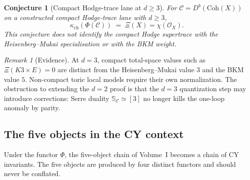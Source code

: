 \documentclass[11pt]{article}
\theoremstyle{plain}
\newtheorem{conjecture}[theorem]{Conjecture}
\theoremstyle{definition}
\theoremstyle{remark}
\newtheorem{remark}[theorem]{Remark}
\newcommand{\cC}{\mathcal{C}}
\newcommand{\cO}{\mathcal{O}}
\newcommand{\bS}{\mathbb{S}}
\newcommand{\Coh}{\mathrm{Coh}}
\begin{document}
\begin{conjecture}[Compact Hodge-trace lane at $d \geq 3$]
\label{conj:v3-st-cy-kappa-d3}
For $\cC=D^b(\Coh(X))$ on a constructed compact Hodge-trace lane with
$d \geq 3$,
\[
 \kappa_{\mathrm{ch}}(\Phi(\cC)) \;=\; \Xi(X)=\chi(\cO_X).
\]
This conjecture does not identify the compact Hodge supertrace with
the Heisenberg--Mukai specialisation or with the BKM weight.
\end{conjecture}

\begin{remark}[Evidence]
\label{rem:v3-st-d3-evidence}
At $d = 3$, compact total-space values such as
$\Xi(K3\times E)=0$ are distinct from the Heisenberg--Mukai value
$3$ and the BKM value $5$.  Non-compact toric local models require
their own normalization.  The obstruction to extending the $d = 2$
proof is that the $d = 3$ quantization step may introduce corrections:
Serre duality $\bS_\cC \simeq [3]$ no longer kills the one-loop
anomaly by parity.
\end{remark}

\subsection{The five objects in the CY context}

Under the functor $\Phi$, the five-object chain of Volume~I
becomes a chain of CY invariants.  The five objects are produced by
four distinct functors and should never be conflated.
\end{document}
